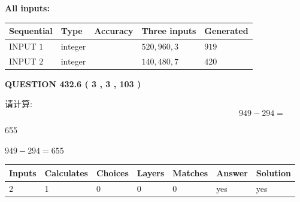 \documentclass{ctexart}
\begin{document}
   
   
   
\noindent\vspace{0.1in}\hspace{-0.08in} {\textbf{\Large{All inputs: }}}
   
   
  
  
\noindent\begin{tabular}{|l|l|l|l|l|}
\hline
 Sequential & Type & Accuracy & Three inputs & Generated \\ 
\hline
 
 
  INPUT $  1 $ & integer &  & $
 520
 , 
 960
 , 
 3
 $ & $ 919 $ 
 \\  \hline  
 
 
  INPUT $  2 $ & integer &  & $
 140
 , 
 480
 , 
 7
 $ & $ 420 $ 
 \\  \hline  
 \end{tabular}
   
   
  
\vspace{0.2in}
  
{\textbf{\Large{QUESTION
432.6 
 ( 3 , 3 , 103 )
}}}
  
  
 
请计算:
\begin{equation}
949 -   %
294 = \nonumber
\end{equation}
 
 
 
\noindent{}
 
 

655
 
 
\noindent{}
 
 

 
 
 
\noindent{}
 
 

$ %
949 -  %
294=   %
655$
 
 
\noindent{}
 
 

 
   
   
   
   
\noindent\begin{tabular}{|l|l|l|l|l|l|l|}
 \hline
Inputs & Calculates & Choices & Layers & Matches & Answer & Solution \\ \hline
 2  & 
 1  & 
 0
  & 
 0  & 
 0  & 
  yes & 
  yes 
  \\ \hline
 \end{tabular}
   
\end{document}
